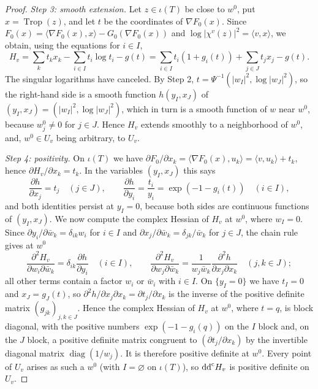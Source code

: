\begin{proof}
\emph{Step 3: smooth extension.} Let $z\in\iota(T)$ be close to $w^0$, put $x=\operatorname{Trop}(z)$, and let $t$ be the coordinates of $\nabla F_0(x)$. Since $F_0(x)=\langle\nabla F_0(x),x\rangle-G_0(\nabla F_0(x))$ and $\log|\chi^v(z)|^2=\langle v,x\rangle$, we obtain, using the equations for $i\in I$,
\[
 H_v=\sum_kt_kx_k-\sum_{i\in I}t_i\log t_i-g(t)
    =\sum_{i\in I}t_i(1+g_i(t))+\sum_{j\in J}t_jx_j-g(t).
\]
The singular logarithms have canceled. By Step 2, $t=\Psi^{-1}(|w_I|^2,\log|w_J|^2)$, so the right-hand side is a smooth function $h(y_I,x_J)$ of $(y_I,x_J)=(|w_I|^2,\log|w_J|^2)$, which in turn is a smooth function of $w$ near $w^0$, because $w^0_j\neq0$ for $j\in J$. Hence $H_v$ extends smoothly to a neighborhood of $w^0$, and, $w^0\in U_v$ being arbitrary, to $U_v$.

\emph{Step 4: positivity.} On $\iota(T)$ we have $\partial F_0/\partial x_k=\langle\nabla F_0(x),u_k\rangle=\langle v,u_k\rangle+t_k$, hence $\partial H_v/\partial x_k=t_k$. In the variables $(y_I,x_J)$ this says
\[
 \frac{\partial h}{\partial x_j}=t_j\quad(j\in J),\qquad
 \frac{\partial h}{\partial y_i}=\frac{t_i}{y_i}=\exp(-1-g_i(t))\quad(i\in I),
\]
and both identities persist at $y_I=0$, because both sides are continuous functions of $(y_I,x_J)$. We now compute the complex Hessian of $H_v$ at $w^0$, where $w_I=0$. Since $\partial y_i/\partial\bar w_k=\delta_{ik}w_i$ for $i\in I$ and $\partial x_j/\partial\bar w_k=\delta_{jk}/\bar w_k$ for $j\in J$, the chain rule gives at $w^0$
\[
 \frac{\partial^2H_v}{\partial w_i\partial\bar w_k}=\delta_{ik}\frac{\partial h}{\partial y_i}\quad(i\in I),\qquad
 \frac{\partial^2H_v}{\partial w_j\partial\bar w_k}=\frac1{w_j\bar w_k}\frac{\partial^2h}{\partial x_j\partial x_k}\quad(j,k\in J);
\]
all other terms contain a factor $w_i$ or $\bar w_i$ with $i\in I$. On $\{y_I=0\}$ we have $t_I=0$ and $x_J=g_J(t)$, so $\partial^2h/\partial x_j\partial x_k=\partial t_j/\partial x_k$ is the inverse of the positive definite matrix $(g_{jk})_{j,k\in J}$. Hence the complex Hessian of $H_v$ at $w^0$, where $t=q$, is block diagonal, with the positive numbers $\exp(-1-g_i(q))$ on the $I$ block and, on the $J$ block, a positive definite matrix congruent to $(\partial t_j/\partial x_k)$ by the invertible diagonal matrix $\operatorname{diag}(1/w_j)$. It is therefore positive definite at $w^0$. Every point of $U_v$ arises as such a $w^0$ (with $I=\varnothing$ on $\iota(T)$), so $\mathrm{dd}^{\mathrm{c}} H_v$ is positive definite on $U_v$.


\end{proof}
